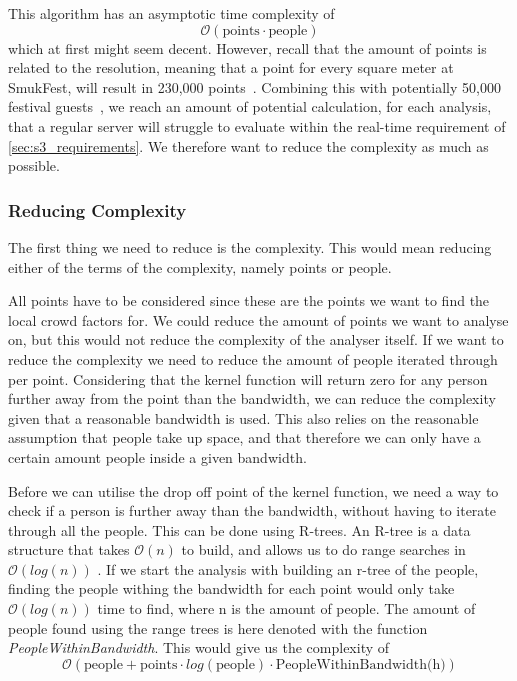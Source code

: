 This algorithm has an asymptotic time complexity of $$\mathcal{O}(\text{points} \cdot \text{people})$$ which at first might seem decent. However, recall that the amount of points is related to the resolution, meaning that a point for every square meter at SmukFest, will result in 230,000 points~\cite{smukFacts}. Combining this with potentially 50,000 festival guests~\cite{smukFacts}, we reach an amount of potential calculation, for each analysis, that a regular server will struggle to evaluate within the real-time requirement of \cref{sec:s3_requirements}. We therefore want to reduce the complexity as much as possible.


\subsubsection{Reducing Complexity}

The first thing we need to reduce is the complexity. This would mean reducing either of the terms of the complexity, namely points or people.

All points have to be considered since these are the points we want to find the local crowd factors for. We could reduce the amount of points we want to analyse on, but this would not reduce the complexity of the analyser itself. If we want to reduce the complexity we need to reduce the amount of people iterated through per point. Considering that the kernel function will return zero for any person further away from the point than the bandwidth, we can reduce the complexity given that a reasonable bandwidth is used. This also relies on the reasonable assumption that people take up space, and that therefore we can only have a certain amount people inside a given bandwidth.

Before we can utilise the drop off point of the kernel function, we need a way to check if a person is further away than the bandwidth, without having to iterate through all the people. This can be done using R-trees. An R-tree is a data structure that takes $\mathcal{O}(n)$ to build, and allows us to do range searches in $\mathcal{O}(log(n))$ \cite{rtree}. If we start the analysis with building an r-tree of the people, finding the people withing the bandwidth for each point would only take $\mathcal{O}(log(n))$ time to find, where n is the amount of people. The amount of people found using the range trees is here denoted with the function \emph{PeopleWithinBandwidth}. This would give us the complexity of $$\mathcal{O}(\text{people} + \text{points} \cdot log(\text{people}) \cdot \text{PeopleWithinBandwidth(h)})$$

